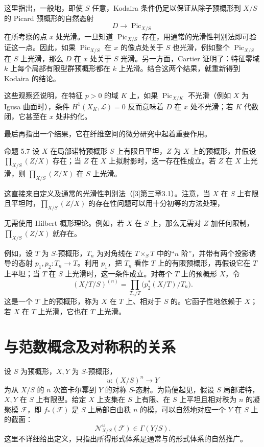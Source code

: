 这里指出，一般地，即使 $S$ 任意，Kodaira 条件仍足以保证从除子预概形到 $X/S$ 的 Picard 预概形的自然态射
\[
D\longrightarrow\operatorname{Pic}_{X/S}
\]
在所考察的点 $x$ 处光滑。一旦知道 $\operatorname{Pic}_{X/S}$ 存在，用通常的光滑性判别法即可验证这一点。因此，如果 $\operatorname{Pic}_{X/S}$ 在 $x$ 的像点处关于 $S$ 也光滑，例如整个 $\operatorname{Pic}_{X/S}$ 在 $S$ 上光滑，那么 $D$ 在 $x$ 处关于 $S$ 光滑。另一方面，Cartier 证明了：特征零域 $k$ 上每个局部有限型群预概形都在 $k$ 上光滑。结合这两个结果，就重新得到 Kodaira 的结论。

这些观察还说明，在特征 $p>0$ 的域 $K$ 上，如果 $\operatorname{Pic}_{X/K}$ 不光滑（例如 $X$ 为 Igusa 曲面时），条件 $H^1(X_K,\mathcal L)=0$ 反而意味着 $D$ 在 $x$ 处不光滑；若 $K$ 代数闭，它甚至在 $x$ 处非约化。

最后再指出一个结果，它在纤维空间的微分研究中起着重要作用。
\begin{statement}{命题 5.7}
设 $X$ 在局部诺特预概形 $S$ 上有限且平坦，$Z$ 为 $X$ 上的预概形，并假设 $\prod_{X/S}(Z/X)$ 存在；当 $Z$ 在 $X$ 上拟射影时，这一存在性成立。若 $Z$ 在 $X$ 上光滑，则 $\prod_{X/S}(Z/X)$ 在 $S$ 上光滑。
\end{statement}
这直接来自定义及通常的光滑性判别法（[3]第三章3.1）。注意，当 $X$ 在 $S$ 上有限且平坦时，$\prod_{X/S}(Z/X)$ 的存在性问题可以用十分初等的方法处理，

无需使用 Hilbert 概形理论。例如，若 $X$ 在 $S$ 上，那么无需对 $Z$ 加任何限制，$\prod_{X/S}(Z/X)$ 就存在。

例如，设 $T$ 为 $S$-预概形，$T_n$ 为对角线在 $T\times_ST$ 中的“$n$ 阶”，并带有两个投影诱导的态射 $p_1,p_2:T_n\to T$。利用 $p_1$，把 $T_n$ 看作 $T$ 上的有限预概形，再假设它在 $T$ 上平坦；当 $T$ 在 $S$ 上光滑时，这一条件成立。对每个 $T$ 上的预概形 $X$，令
\[
(X/T/S)^{(n)}=\prod_{T_n/T}\bigl(p_2^*(X/T)/T_n\bigr).
\]
这是一个 $T$ 上的预概形，称为 $X$ 在 $T$ 上、相对于 $S$ 的。它函子性地依赖于 $X$；若 $X$ 在 $T$ 上光滑，它也在 $T$ 上光滑。

\section{与范数概念及对称积的关系}
设 $S$ 为预概形，$X,Y$ 为 $S$-预概形，
\[
u:(X/S)^n\longrightarrow Y
\]
为从 $X/S$ 的 $n$ 次笛卡尔幂到 $Y$ 的对称 $S$-态射。为简便起见，假设 $S$ 局部诺特，$X,Y$ 在 $S$ 上有限型。给定 $X$ 上支集在 $S$ 上有限、在 $S$ 上平坦且相对秩为 $n$ 的凝聚模 $\mathcal F$，即 $f_*(\mathcal F)$ 是 $S$ 上局部自由秩 $n$ 的模，可以自然地对应一个 $Y$ 在 $S$ 上的截面：
\[
\mathcal N^u_{X/S}(\mathcal F)\in\Gamma(Y/S).
\]
这里不详细给出定义，只指出所得形式体系是通常与的形式体系的自然推广。

